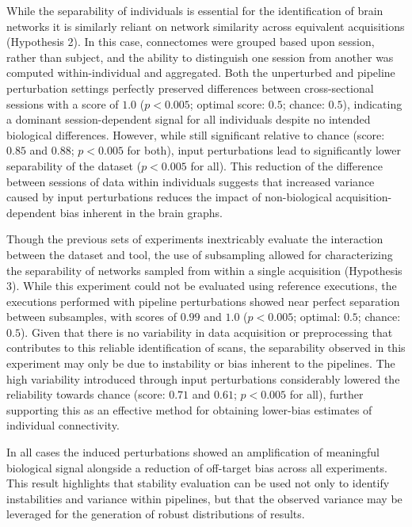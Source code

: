\documentclass[fleqn,10pt]{SelfArx} %
\begin{document}
While the separability of individuals is essential for the identification of brain networks it is similarly reliant on
network similarity across equivalent acquisitions (Hypothesis 2). In this case, connectomes were grouped based upon
session, rather than subject, and the ability to distinguish one session from another was computed within-individual
and aggregated. Both the unperturbed and pipeline perturbation settings perfectly preserved differences between
cross-sectional sessions with a score of $1.0$ ($p < 0.005$; optimal score: $0.5$; chance: $0.5$), indicating a
dominant session-dependent signal for all individuals despite no intended biological differences. However, while still
significant relative to chance (score: $0.85$ and $0.88$; $p < 0.005$ for both), input perturbations lead to
significantly lower separability of the dataset ($p < 0.005$ for all). This reduction of the difference between
sessions of data within individuals suggests that increased variance caused by input perturbations reduces the impact
of non-biological acquisition-dependent bias inherent in the brain graphs.

Though the previous sets of experiments inextricably evaluate the interaction between the dataset and tool, the use of
subsampling allowed for characterizing the separability of networks sampled from within a single acquisition
(Hypothesis 3). While this experiment could not be evaluated using reference executions, the executions performed
with pipeline perturbations showed near perfect separation between subsamples, with scores of $0.99$ and $1.0$
($p < 0.005$; optimal: $0.5$; chance: $0.5$). Given that there is no variability in data acquisition or preprocessing
that contributes to this reliable identification of scans, the separability observed in this experiment may only be due
to instability or bias inherent to the pipelines. The high variability introduced through input perturbations
considerably lowered the reliability towards chance (score: $0.71$ and $0.61$; $p < 0.005$ for all), further supporting
this as an effective method for obtaining lower-bias estimates of individual connectivity.

In all cases the induced perturbations showed an amplification of meaningful biological signal alongside a reduction of
off-target bias across all experiments. This result highlights that stability evaluation can be used not only to
identify instabilities and variance within pipelines, but that the observed variance may be leveraged for the
generation of robust distributions of results.
\end{document}
